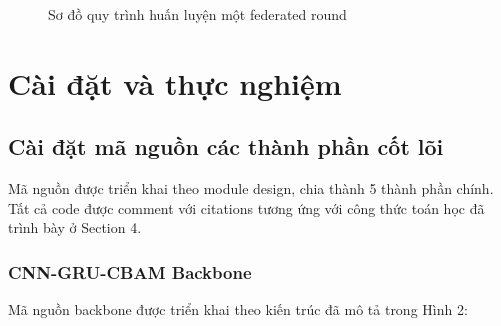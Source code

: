 \documentclass[12pt,a4paper]{article}
\begin{document}
\begin{figure}[H]
    \caption{Sơ đồ quy trình huấn luyện một federated round}
    \label{fig:training_workflow}
\end{figure}

\section{Cài đặt và thực nghiệm}

\subsection{Cài đặt mã nguồn các thành phần cốt lõi}

Mã nguồn được triển khai theo module design, chia thành 5 thành phần chính. Tất cả code được comment với citations tương ứng với công thức toán học đã trình bày ở Section 4.

\subsubsection{CNN-GRU-CBAM Backbone}

Mã nguồn backbone được triển khai theo kiến trúc đã mô tả trong Hình 2:
\end{document}
